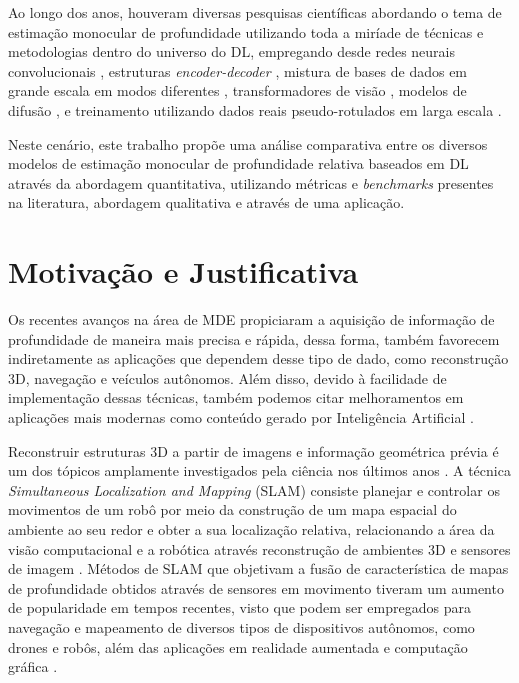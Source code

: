 Ao longo dos anos, houveram diversas pesquisas científicas abordando o tema de estimação monocular de profundidade utilizando toda a miríade de técnicas e metodologias dentro do universo do DL, empregando desde redes neurais convolucionais \cite{kopf2021robust}, estruturas \textit{encoder-decoder} \cite{godard2019digging}, mistura de bases de dados em grande escala em modos diferentes \cite{lasinger2019towards}, transformadores de visão \cite{birkl2023midas}, modelos de difusão \cite{ke2024repurposing}, e treinamento utilizando dados reais pseudo-rotulados em larga escala \cite{yang2024depth}. 

Neste cenário, este trabalho propõe uma análise comparativa entre os diversos modelos de estimação monocular de profundidade relativa baseados em DL através da abordagem quantitativa, utilizando métricas e \textit{benchmarks} presentes na literatura, abordagem qualitativa e através de uma aplicação.



\section{Motivação e Justificativa} 

Os recentes avanços na área de MDE propiciaram a aquisição de informação de profundidade de maneira mais precisa e rápida, dessa forma, também favorecem indiretamente as aplicações que dependem desse tipo de dado, como reconstrução 3D, navegação e veículos autônomos. Além disso, devido à facilidade de implementação dessas técnicas, também podemos citar melhoramentos em aplicações mais modernas como conteúdo gerado por Inteligência Artificial \cite{yang2024depth}.


Reconstruir estruturas 3D a partir de imagens e informação geométrica prévia é um dos tópicos amplamente investigados pela ciência nos últimos anos \cite{zhao2020monocular}. A técnica \textit{Simultaneous Localization and Mapping} (SLAM) consiste planejar e controlar os movimentos de um robô por meio da construção de um mapa espacial do ambiente ao seu redor e obter a sua localização relativa, relacionando a área da visão computacional e a robótica através reconstrução de ambientes 3D e sensores de imagem \cite{placed2023survey} \cite{stachniss2016simultaneous}. Métodos de SLAM que objetivam a fusão de característica de mapas de profundidade obtidos através de sensores em movimento tiveram um aumento de popularidade em tempos recentes, visto que podem ser empregados para navegação e mapeamento de diversos tipos de dispositivos autônomos, como drones e robôs, além das aplicações em realidade aumentada e computação gráfica \cite{tateno2017cnn}.



